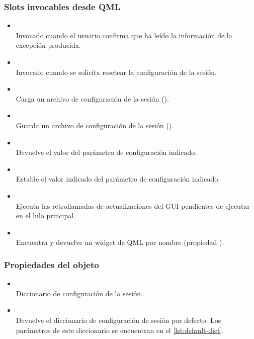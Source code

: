 \subsubsection{Slots invocables desde QML}

\begin{itemize}
\item {}\\
Invocado cuando el usuario confirma que ha leído la información de la excepción producida.
\item {}\\
Invocado cuando se solicita resetear la configuración de la sesión.
\item {}\\
Carga un archivo de configuración de la sesión ().
\item {}\\
Guarda un archivo de configuración de la sesión ().
\item {}\\
Devuelve el valor del parámetro de configuración indicado.
\item {}\\
Estable el valor indicado del parámetro de configuración indicado.
\item {}\\
Ejecuta las retrollamadas de actualizaciones del GUI pendientes de ejecutar en el hilo principal.
\item {}\\
Encuentra y devuelve un widget de QML por nombre (propiedad ).
\end{itemize}

\subsubsection{Propiedades del objeto}

\begin{itemize}
\item {}\\
Diccionario de configuración de la sesión.
\item {}\\
Devuelve el diccionario de configuración de sesión por defecto. Los parámetros de este diccionario se encuentran en el \autoref{lst:default-dict}.
\end{itemize}

